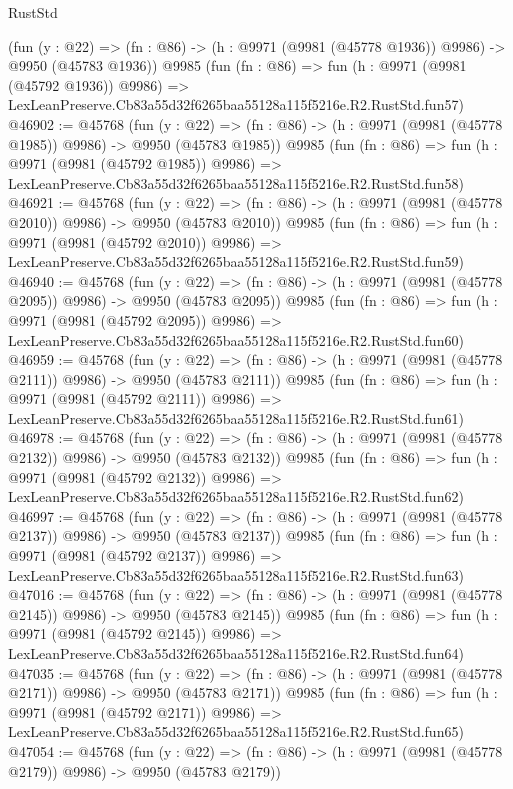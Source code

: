 \begin{lexlean}{RustStd}
\begin{coremodule}
    (fun (y : @22) =>
    (fn : @86) -> (h : @9971 (@9981 (@45778 @1936)) @9986) -> @9950 (@45783 @1936))
    @9985
    (fun (fn : @86) =>
    fun (h : @9971 (@9981 (@45792 @1936)) @9986) =>
    LexLeanPreserve.Cb83a55d32f6265baa55128a115f5216e.R2.RustStd.fun57)
@46902 := @45768
    (fun (y : @22) =>
    (fn : @86) -> (h : @9971 (@9981 (@45778 @1985)) @9986) -> @9950 (@45783 @1985))
    @9985
    (fun (fn : @86) =>
    fun (h : @9971 (@9981 (@45792 @1985)) @9986) =>
    LexLeanPreserve.Cb83a55d32f6265baa55128a115f5216e.R2.RustStd.fun58)
@46921 := @45768
    (fun (y : @22) =>
    (fn : @86) -> (h : @9971 (@9981 (@45778 @2010)) @9986) -> @9950 (@45783 @2010))
    @9985
    (fun (fn : @86) =>
    fun (h : @9971 (@9981 (@45792 @2010)) @9986) =>
    LexLeanPreserve.Cb83a55d32f6265baa55128a115f5216e.R2.RustStd.fun59)
@46940 := @45768
    (fun (y : @22) =>
    (fn : @86) -> (h : @9971 (@9981 (@45778 @2095)) @9986) -> @9950 (@45783 @2095))
    @9985
    (fun (fn : @86) =>
    fun (h : @9971 (@9981 (@45792 @2095)) @9986) =>
    LexLeanPreserve.Cb83a55d32f6265baa55128a115f5216e.R2.RustStd.fun60)
@46959 := @45768
    (fun (y : @22) =>
    (fn : @86) -> (h : @9971 (@9981 (@45778 @2111)) @9986) -> @9950 (@45783 @2111))
    @9985
    (fun (fn : @86) =>
    fun (h : @9971 (@9981 (@45792 @2111)) @9986) =>
    LexLeanPreserve.Cb83a55d32f6265baa55128a115f5216e.R2.RustStd.fun61)
@46978 := @45768
    (fun (y : @22) =>
    (fn : @86) -> (h : @9971 (@9981 (@45778 @2132)) @9986) -> @9950 (@45783 @2132))
    @9985
    (fun (fn : @86) =>
    fun (h : @9971 (@9981 (@45792 @2132)) @9986) =>
    LexLeanPreserve.Cb83a55d32f6265baa55128a115f5216e.R2.RustStd.fun62)
@46997 := @45768
    (fun (y : @22) =>
    (fn : @86) -> (h : @9971 (@9981 (@45778 @2137)) @9986) -> @9950 (@45783 @2137))
    @9985
    (fun (fn : @86) =>
    fun (h : @9971 (@9981 (@45792 @2137)) @9986) =>
    LexLeanPreserve.Cb83a55d32f6265baa55128a115f5216e.R2.RustStd.fun63)
@47016 := @45768
    (fun (y : @22) =>
    (fn : @86) -> (h : @9971 (@9981 (@45778 @2145)) @9986) -> @9950 (@45783 @2145))
    @9985
    (fun (fn : @86) =>
    fun (h : @9971 (@9981 (@45792 @2145)) @9986) =>
    LexLeanPreserve.Cb83a55d32f6265baa55128a115f5216e.R2.RustStd.fun64)
@47035 := @45768
    (fun (y : @22) =>
    (fn : @86) -> (h : @9971 (@9981 (@45778 @2171)) @9986) -> @9950 (@45783 @2171))
    @9985
    (fun (fn : @86) =>
    fun (h : @9971 (@9981 (@45792 @2171)) @9986) =>
    LexLeanPreserve.Cb83a55d32f6265baa55128a115f5216e.R2.RustStd.fun65)
@47054 := @45768
    (fun (y : @22) =>
    (fn : @86) -> (h : @9971 (@9981 (@45778 @2179)) @9986) -> @9950 (@45783 @2179))

\end{coremodule}
\end{lexlean}
